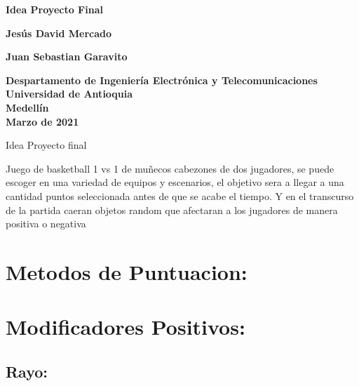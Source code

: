 \documentclass{article}
\begin{document}
\begin{titlepage}
    \begin{center}
        \vspace*{1cm}
            
        \Huge
        \textbf{Idea Proyecto Final}
            
        \vspace{0.5cm}
        
            
        \vspace{1.5cm}
            
        \textbf{Jesús David Mercado}
        
        \textbf{Juan Sebastian Garavito}
            
        \vfill
            
        \vspace{0.8cm}
            
        \Huge
        \textbf{Despartamento de Ingeniería Electrónica y Telecomunicaciones\\
        Universidad de Antioquia\\
        Medellín\\
        Marzo de 2021}
            
    \end{center}
\end{titlepage}


\newpage
\begin{center}
\Huge{Idea Proyecto final}
\end{center}
\justify
\large
{Juego de basketball 1 vs 1 de muñecos cabezones de dos jugadores, se puede escoger en una variedad de equipos y escenarios, el objetivo sera a llegar a una cantidad puntos seleccionada antes de que se acabe el tiempo. Y en el transcurso de la partida caeran objetos random que afectaran a los jugadores de manera positiva o negativa}
\section{\large{Metodos de Puntuacion: }}
\section{\large{\textbf{Modificadores Positivos:}}}
\subsection{Rayo: }
\large
\end{document}
